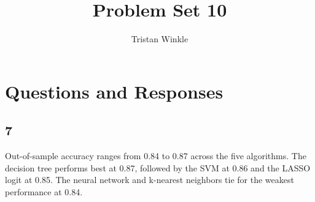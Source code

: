 \documentclass[12pt]{article}
\title{Problem Set 10}
\author{Tristan Winkle}
\date{}
\begin{document}
\maketitle

\section{Questions and Responses}

\subsection*{7}

\begin{table}[!htbp]
\centering
\caption{Optimal Tuning Parameters}
\vspace{0.5em}
\begin{minipage}{\textwidth}
\centering
{}
\vspace{0.5em}
\footnotesize
\end{minipage}
\end{table}

\noindent Out-of-sample accuracy ranges from 0.84 to 0.87 across the five algorithms. The decision tree performs best at 0.87, followed by the SVM at 0.86 and the LASSO logit at 0.85. The neural network and k-nearest neighbors tie for the weakest performance at 0.84. 


\end{document}
